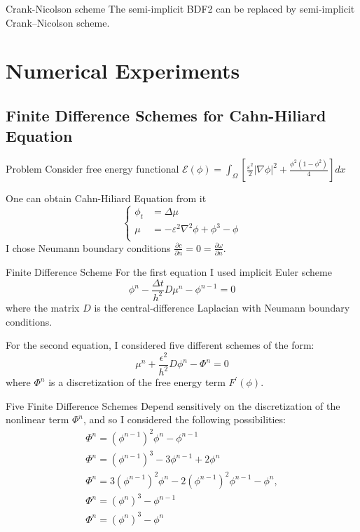 \documentclass[9pt]{beamer}
\begin{document}
\begin{frame}{Crank-Nicolson scheme}
The semi-implicit BDF2 can be replaced by semi-implicit Crank–Nicolson scheme.
\end{frame}

\section{Numerical Experiments}

\subsection{Finite Difference Schemes for Cahn-Hiliard Equation}
\begin{frame}{Problem}
Consider free energy functional $\mathcal E(\phi) = \int_{\Omega} \left[ \frac{\varepsilon^2}{2}|\nabla \phi|^2 + \frac{\phi^2(1-\phi^2)}{4} \right]dx$

One can obtain Cahn-Hiliard Equation from it
$$\left\{
\begin{aligned}
\phi_t &= \Delta \mu \\
\mu &= -\varepsilon^2\nabla^2\phi +\phi^3 - \phi\\
\end{aligned}
\right.$$
I chose Neumann boundary conditions $\frac{\partial c}{\partial n}=0=\frac{\partial \omega}{\partial n}$.
\end{frame}

\begin{frame}{Finite Difference Scheme}
For the first equation I used implicit Euler scheme
$$\phi^{n}- \frac{\Delta t}{h^2} D \mu^{n}-\phi^{n-1}=0$$
where the matrix $D$ is the central-difference Laplacian with Neumann boundary conditions.

For the second equation, I considered five different schemes of the form:
$$\mu^{n}+\frac{\epsilon^{2}}{h^{2}} D \phi^{n}-\Phi^{n}=0$$
where $\Phi^n$ is a discretization of the free energy term $F^{\prime}(\phi)$.
\end{frame}

\begin{frame}{Five Finite Difference Schemes}
Depend sensitively on the discretization of the nonlinear term $\Phi^n$, and so I considered the following possibilities:
$$
\begin{array}{l}
\Phi^{n}=\left(\phi^{n-1}\right)^{2} \phi^{n}-\phi^{n-1} \\
\Phi^{n}=\left(\phi^{n-1}\right)^{3}-3 \phi^{n-1}+2 \phi^{n} \\
\Phi^{n}=3\left(\phi^{n-1}\right)^{2} \phi^{n}-2\left(\phi^{n-1}\right)^{2} \phi^{n-1}-\phi^{n}, \\
\Phi^{n}=\left(\phi^{n}\right)^{3}-\phi^{n-1} \\
\Phi^{n}=\left(\phi^{n}\right)^{3}-\phi^{n}
\end{array}
$$
\end{frame}
\end{document}
